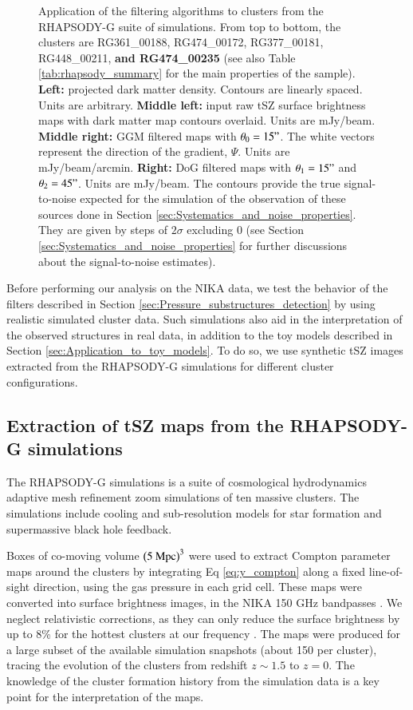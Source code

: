 \documentclass[twocolumn,traditabstract]{aa}
\begin{document}
\begin{figure}[h]
\caption{\footnotesize{Application of the filtering algorithms to clusters from the RHAPSODY-G suite of simulations. From top to bottom, the clusters are RG361\_00188, RG474\_00172, RG377\_00181, RG448\_00211, {\bf and RG474\_00235} (see also Table \ref{tab:rhapsody_summary} for the main properties of the sample). {\bf Left:} projected dark matter density. Contours are linearly spaced. Units are arbitrary. {\bf Middle left:} input raw tSZ surface brightness maps with dark matter map contours overlaid. Units are mJy/beam. {\bf Middle right:} GGM filtered maps with $\theta_0 = 15"$. The white vectors represent the direction of the gradient, $\Psi$. Units are mJy/beam/arcmin. {\bf Right:} DoG filtered maps with $\theta_1 = 15"$ and $\theta_2 = 45"$. Units are mJy/beam. The contours provide the true signal-to-noise expected for the simulation of the observation of these sources done in Section \ref{sec:Systematics_and_noise_properties}. They are given by steps of $2 \sigma$ excluding 0 (see Section \ref{sec:Systematics_and_noise_properties} for further discussions about the signal-to-noise estimates).}}
\label{fig:RG_cluster_sample}
\end{figure}

Before performing our analysis on the NIKA data, we test the behavior of the filters described in Section \ref{sec:Pressure_substructures_detection} by using realistic simulated cluster data. Such simulations also aid in the interpretation of the observed structures in real data, in addition to the toy models described in Section \ref{sec:Application_to_toy_models}. To do so, we use synthetic tSZ images extracted from the RHAPSODY-G simulations for different cluster configurations.

\subsection{Extraction of tSZ maps from the RHAPSODY-G simulations}
The RHAPSODY-G simulations \citep{Wu2013,Hahn2017} is a suite of cosmological hydrodynamics adaptive mesh refinement zoom simulations of ten massive clusters. The simulations include cooling and sub-resolution models for star formation and supermassive black hole feedback. 

Boxes of co-moving volume $\left(5 \ {\rm Mpc}\right)^3$ were used to extract Compton parameter maps around the clusters by integrating Eq \ref{eq:y_compton} along a fixed line-of-sight direction, using the gas pressure in each grid cell. These maps were converted into surface brightness images, in the NIKA 150 GHz bandpasses \citep[see the coefficient provided in][]{Adam2016b}. We neglect relativistic corrections, as they can only reduce the surface brightness by up to 8\% for the hottest clusters at our frequency \citep{Itoh2003}. The maps were produced for a large subset of the available simulation snapshots (about 150 per cluster), tracing the evolution of the clusters from redshift $z \sim 1.5$ to $z=0$. The knowledge of the cluster formation history from the simulation data is a key point for the interpretation of the maps.
\end{document}
